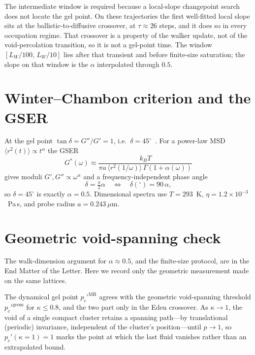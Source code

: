 \documentclass[aps,prl,twocolumn,superscriptaddress,floatfix,nofootinbib,longbibliography]{revtex4-2}
\newcommand{\msd}{\langle r^2(t)\rangle}
\newcommand{\pcp}{p_c'}
\newcommand{\kap}{\kappa}
\begin{document}
The intermediate window is required because a local-slope changepoint search does not locate the gel point. On these trajectories the first well-fitted local slope sits at the ballistic-to-diffusive crossover, at $\tau \approx 26$ steps, and it does so in every occupation regime. That crossover is a property of the walker update, not of the void-percolation transition, so it is not a gel-point time. The window $[L_W/100,\,L_W/10]$ lies after that transient and before finite-size saturation; the slope on that window is the $\alpha$ interpolated through $0.5$.

\section{Winter--Chambon criterion and the GSER}
At the gel point $\tan\delta=G''/G'=1$, i.e.\ $\delta=45^{\circ}$~\cite{Winter1987,Chambon1987}.
For a power-law MSD $\msd\propto t^{\alpha}$ the GSER~\cite{Mason1995,Mason2000}
\begin{equation}
  G^*(\omega)\approx\frac{k_BT}{\pi a\,\langle r^2(1/\omega)\rangle\,\Gamma(1+\alpha(\omega))}
\end{equation}
gives moduli $G',G''\propto\omega^{\alpha}$ and a frequency-independent phase angle
\begin{equation}
  \delta=\tfrac{\pi}{2}\alpha \quad\Longleftrightarrow\quad \delta(^{\circ})=90\,\alpha,
\end{equation}
so $\delta=45^{\circ}$ is exactly $\alpha=0.5$. Dimensional spectra use $T=293$~K,
$\eta=1.2\times10^{-3}$~Pa\,s, and probe radius $a=0.243~\mu$m.

\section{Geometric void-spanning check}
The walk-dimension argument for $\alpha\approx0.5$, and the finite-size protocol, are in the End Matter of the Letter. Here we record only the geometric measurement made on the same lattices.

The dynamical gel point $\pcp^{\mathrm{MR}}$ agrees with the geometric void-spanning threshold $\pcp^{\mathrm{geom}}$ for $\kap\le0.8$, and the two part only in the Eden crossover. As $\kap\to1$, the void of a
single compact cluster retains a spanning path---by translational (periodic) invariance, independent
of the cluster's position---until $p\to1$, so $\pcp(\kap{=}1)=1$ marks the point at which the last
fluid vanishes rather than an extrapolated bound.
\end{document}
